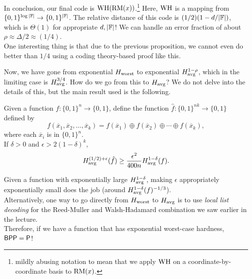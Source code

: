 		In conclusion, our final code is $\operatorname{WH}(\operatorname{RM}(x))$.\footnote{mildly abusing notation to mean that we apply $\operatorname{WH}$ on a coordinate-by-coordinate basis to $\operatorname{RM}(x)$.} Here, $\operatorname{WH}$ is a mapping from $\{0,1\}^{\log|\mathbb{F}|} \to \{0,1\}^{|\mathbb{F}|}$. The relative distance of this code is $(1/2)(1 - d/|\mathbb{F}|)$, which is $\Theta(1)$ for appropriate $d,|\mathbb{F}|$! We can handle an error fraction of about $\rho \approx \Delta/2 \approx (1/4)$.\\
		One interesting thing is that due to the previous proposition, we cannot even do better than $1/4$ using a coding theory-based proof like this.

		Now, we have gone from exponential $H_{\text{worst}}$ to exponential $H_{\text{avg}}^{1-\rho}$, which in the limiting case is $H_{\text{avg}}^{3/4}$. How do we go from this to $H_{\text{avg}}$? We do not delve into the details of this, but the main result used is the following.

		\begin{ftheo}
			Given a function $f : \{0,1\}^n \to \{0,1\}$, define the function $\hat{f} : \{0,1\}^{nk} \to \{0,1\}$ defined by
			\[ f(\overline{x}_1 , \overline{x}_2 , \ldots , \overline{x}_k) = f(\overline{x}_1) \oplus f(\overline{x}_2) \oplus \cdots \oplus f(\overline{x}_k), \]
			where each $\overline{x}_i$ is in $\{0,1\}^n$.\\
			If $\delta > 0$ and $\epsilon > 2(1-\delta)^k$,
			\[ H_{\text{avg}}^{(1/2) + \epsilon} (\hat{f}) \ge \frac{\epsilon^2}{400n} H_{\text{avg}}^{1-\delta}(f). \]
		\end{ftheo}
		Given a function with exponentially large $H_{\text{avg}}^{1-\delta}$, making $\epsilon$ appropriately exponentially small does the job (around $H_{\text{avg}}^{1-\delta}(f)^{-1/3}$).\\
		Alternatively, one way to go directly from $H_{\text{worst}}$ to $H_{\text{avg}}$ is to use \emph{local list decoding} for the Reed-Muller and Walsh-Hadamard combination we saw earlier in the lecture.\\

		Therefore, if we have a function that has exponential worst-case hardness, $\mathsf{BPP} = \mathsf{P}$!

\clearpage